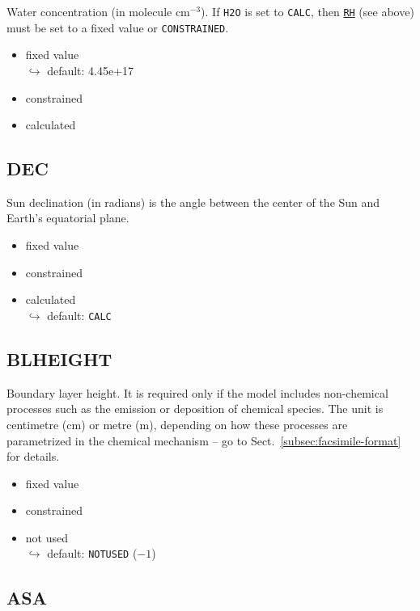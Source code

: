 Water concentration (in molecule cm$^{-3}$). If \texttt{H2O} is set to \texttt{CALC}, then
\hyperref[subsec:rh]{\texttt{RH}} (see above) must be set to a fixed value or
\texttt{CONSTRAINED}.

\begin{itemize}
\item fixed value\\
  $\hookrightarrow$ default: 4.45e+17
\item constrained
\item calculated
\end{itemize}

\subsection{DEC} \label{subsec:dec}

Sun declination (in radians) is the angle between the center of the Sun and Earth's equatorial
plane.

\begin{itemize}
\item fixed value
\item constrained
\item calculated\\
  $\hookrightarrow$ default: \texttt{CALC}
\end{itemize}

\subsection{BLHEIGHT} \label{subsec:blheight}

Boundary layer height. It is required only if the model includes non-chemical processes such as
the emission or deposition of chemical species. The unit is centimetre (cm) or metre (m),
depending on how these processes are parametrized in the chemical mechanism -- go to
Sect.~\ref{subsec:facsimile-format} for details.

\begin{itemize}
\item fixed value
\item constrained
\item not used\\
  $\hookrightarrow$ default: \texttt{NOTUSED} ($-1$)
\end{itemize}

\subsection{ASA} \label{subsec:asa}

